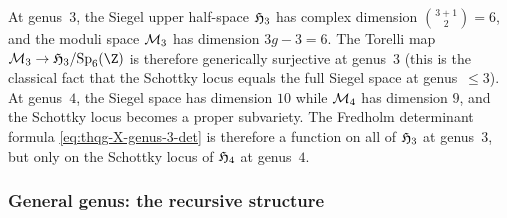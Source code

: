 \begin{remark}%
\label{rem:thqg-X-schottky}%
%
At genus~$3$, the Siegel upper half-space $\mathfrak{H}_3$ has
complex dimension $\binom{3+1}{2} = 6$, and the moduli space
$\mathcal{M}_3$ has dimension $3g-3 = 6$. The Torelli map
$\cM_3 \to \Siegel_3/\Sp_6(\Z)$ is therefore generically
surjective at genus~$3$ (this is the classical fact that the
Schottky locus equals the full Siegel space at genus~$\leq 3$).
At genus~$4$, the Siegel space has dimension $10$ while $\mathcal{M}_4$
has dimension $9$, and the Schottky locus becomes a proper
subvariety. The Fredholm determinant formula
\eqref{eq:thqg-X-genus-3-det} is therefore a function on all of
$\mathfrak{H}_3$ at genus~$3$, but only on the Schottky locus of
$\mathfrak{H}_4$ at genus~$4$.
\end{remark}

\subsubsection{General genus: the recursive structure}

